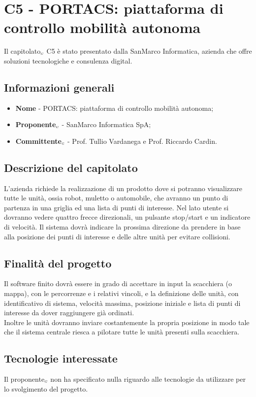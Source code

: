 \chapter{C5 - PORTACS: piattaforma di controllo mobilità autonoma} \label{CapitolatoC5}
Il capitolato$_{\scaleto{G}{3pt}}$ C5 è stato presentato dalla SanMarco Informatica, azienda che offre soluzioni tecnologiche e consulenza digital.
\section{Informazioni generali} \label{C5InformazioniGenerali}
\begin{itemize}
	\item \textbf{Nome} - PORTACS: piattaforma di controllo mobilità autonoma;
	\item \textbf{Proponente}$_{\scaleto{G}{3pt}}$ - SanMarco Informatica SpA;
	\item \textbf{Committente}$_{\scaleto{G}{3pt}}$ - Prof. Tullio Vardanega e Prof. Riccardo Cardin.
\end{itemize}
\section{Descrizione del capitolato} \label{C5DescrizioneDelCapitolato}
L'azienda richiede la realizzazione di un prodotto dove si potranno visualizzare tutte le unità, ossia robot, muletto o automobile, che avranno un punto di partenza in una griglia ed una lista di punti di interesse. Nel lato utente si dovranno vedere quattro frecce direzionali, un pulsante stop/start e un indicatore di velocità. Il sistema dovrà indicare la prossima direzione da prendere in base alla posizione dei punti di interesse e delle altre unità per evitare collisioni.
\section{Finalità del progetto} \label{C5FinalitàDelProgetto}
Il software finito dovrà essere in grado di accettare in input la scacchiera (o mappa), con le percorrenze e i relativi vincoli, e la definizione delle unità, con identificativo di sistema, velocità massima, posizione iniziale e lista di punti di interesse da dover raggiungere già ordinati. \\
Inoltre le unità dovranno inviare costantemente la propria posizione in modo tale che il sistema centrale riesca a pilotare tutte le unità presenti sulla scacchiera.
\section{Tecnologie interessate} \label{C5TecnologieInteressate}
Il proponente$_{\scaleto{G}{3pt}}$ non ha specificato nulla riguardo alle tecnologie da utilizzare per lo svolgimento del progetto.
